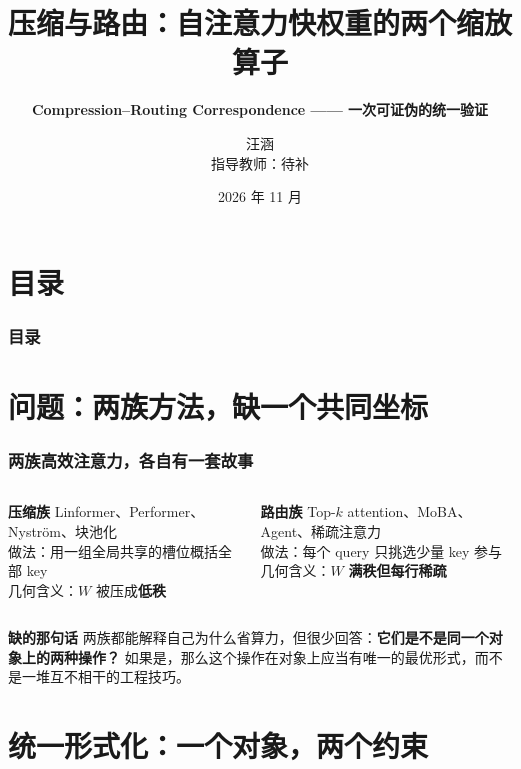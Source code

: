 \documentclass[10pt,aspectratio=169,mathserif]{beamer}
\title[压缩与路由]{压缩与路由：自注意力快权重的两个缩放算子}
\subtitle{\fontsize{9pt}{14pt}\selectfont \textbf{Compression--Routing Correspondence —— 一次可证伪的统一验证}}
\author[汪涵]{
  汪涵 \\\medskip
  {\small 指导教师：待补}}
\institute[SEU]{东南大学\quad 集成电路学院}
\date[2026.11]{2026 年 11 月}
\begin{document}
\begin{frame}
\titlepage
\end{frame}

\section*{目录}
\begin{frame}
\frametitle{\textbf{目录}}
\textbf{\tableofcontents}
\end{frame}

\section[问题]{问题：两族方法，缺一个共同坐标}

\begin{frame}
\frametitle{\textbf{两族高效注意力，各自有一套故事}}
  \begin{columns}[T]
      \begin{block}{\textbf{压缩族}}
        \footnotesize
        Linformer、Performer、Nystr\"om、块池化 \\
        \medskip
        做法：用一组全局共享的槽位概括全部 key \\
        \medskip
        几何含义：$W$ 被压成\textbf{低秩}
      \end{block}

      \begin{block}{\textbf{路由族}}
        \footnotesize
        Top-$k$ attention、MoBA、Agent、稀疏注意力 \\
        \medskip
        做法：每个 query 只挑选少量 key 参与 \\
        \medskip
        几何含义：$W$ \textbf{满秩但每行稀疏}
      \end{block}
  \end{columns}

  \vspace{0.5em}
  \begin{block}{\textbf{缺的那句话}}
    \small
    两族都能解释自己为什么省算力，但很少回答：\textbf{它们是不是同一个对象上的两种操作？}
    如果是，那么这个操作在对象上应当有唯一的最优形式，而不是一堆互不相干的工程技巧。
  \end{block}
\end{frame}

\section[形式化]{统一形式化：一个对象，两个约束}
\end{document}

